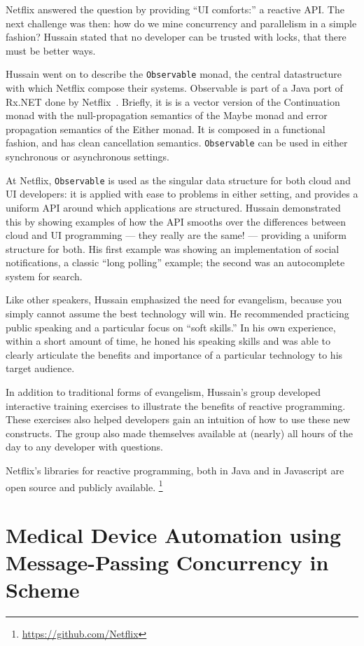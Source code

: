 \documentclass{jfp1}
\begin{document}
Netflix answered the question by providing ``UI comforts:'' a reactive
API. The next challenge was then: how do we mine concurrency and
parallelism in a simple fashion? Hussain stated that no developer can
be trusted with locks, that there must be better ways.

Hussain went on to describe the \texttt{Observable} monad, the central
datastructure with which Netflix compose their systems. Observable is
part of a Java port of Rx.NET done by
Netflix~\cite{Christensen:2013:Reactive}. Briefly, it is is a vector
version of the Continuation monad with the null-propagation semantics
of the Maybe monad and error propagation semantics of the Either
monad. It is composed in a functional fashion, and has clean
cancellation semantics. \texttt{Observable} can be used in either
synchronous or asynchronous settings.

At Netflix, \texttt{Observable} is used as the singular data structure
for both cloud and UI developers: it is applied with ease to problems
in either setting, and provides a uniform API around which
applications are structured. Hussain demonstrated this by showing
examples of how the API smooths over the differences between cloud
and UI programming --- they really are the same! --- providing a
uniform structure for both. His first example was showing an
implementation of social notifications, a classic ``long polling''
example; the second was an autocomplete system for search.

Like other speakers, Hussain emphasized the need for evangelism,
because you simply cannot assume the best technology will win.
He recommended practicing public speaking and a particular focus
on ``soft skills.'' In his own experience, within a short amount of time,
he honed his speaking skills and was able to clearly articulate the
benefits and importance of a particular technology to his target 
audience.

In addition to traditional forms of evangelism, Hussain's group
developed interactive training exercises to illustrate the benefits
of reactive programming. These exercises also helped developers gain
an intuition of how to use these new constructs. The group  also made
themselves available at (nearly) all hours of the day to any developer
with questions.

Netflix's libraries for reactive programming, both in Java and in 
Javascript are open source and publicly available.
\footnote{\url{https://github.com/Netflix}}

\section{Medical Device Automation using Message-Passing 
Concurrency in Scheme}
\end{document}
